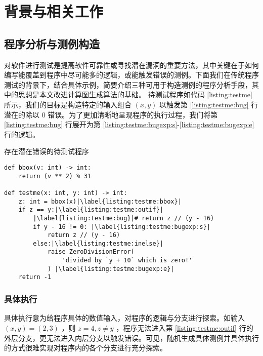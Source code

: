 
\chapter{背景与相关工作}
\label{chp:bg}

\section{程序分析与测例构造}

对软件进行测试是提高软件可靠性或寻找潜在漏洞的重要方法，其中关键在于如何编写能覆盖到程序中尽可能多的逻辑，或能触发错误的测例。下面我们在传统程序测试的背景下，结合具体示例，简要介绍三种可用于构造测例的程序分析手段，其中的思想是本文改进计算图生成算法的基础。
待测试程序如代码 \ref{listing:testme} 所示，我们的目标是构造特定的输入组合 $(x, y)$ 以触发第 \ref{listing:testme:bug} 行潜在的除以 0 错误。为了更加清晰地呈现程序的执行过程，我们将第 \ref{listing:testme:bug} 行展开为第 \ref{listing:testme:bugexp:s}-\ref{listing:testme:bugexp:e} 行的逻辑。

\begin{listing}[]
    \caption{存在潜在错误的待测试程序}
    \label{listing:testme}
\begin{verbatim}
def bbox(v: int) -> int:
    return (v ** 2) % 31

def testme(x: int, y: int) -> int:
    z: int = bbox(x)|\label{listing:testme:bbox}|
    if z == y:|\label{listing:testme:outif}|
        |\label{listing:testme:bug}|# return z // (y - 16)
        if y - 16 != 0: |\label{listing:testme:bugexp:s}|
            return z // (y - 16)
        else:|\label{listing:testme:inelse}|
            raise ZeroDivisionError(
                'divided by `y + 10` which is zero!'
            ) |\label{listing:testme:bugexp:e}|
    return -1
\end{verbatim}
\end{listing}

\subsection{具体执行}

具体执行意为给程序具体的数值输入，对程序的逻辑与分支进行探索。如输入 $(x, y) = (2, 3)$ ，则 $z = 4, z \neq y$ ，程序无法进入第 \ref{listing:testme:outif} 行的外层分支，更无法进入内层分支以触发错误。可见，随机生成具体测例并具体执行的方式很难实现对程序内的各个分支进行充分探索。

